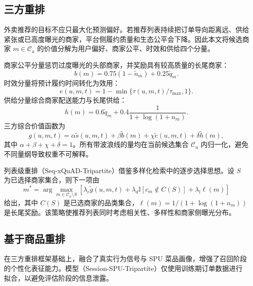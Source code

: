 \documentclass[12pt,a4paper]{article}
\begin{document}
    \subsection{三方重排}

    外卖推荐的目标不应只最大化预测偏好。若推荐列表持续把订单导向距离远、供给紧张或已高度曝光的商家，平台侧履约质量和生态公平会下降。因此本文将候选商家 $m\in\mathcal{C}_u$ 的价值分解为用户偏好、商家公平、时效和供给四个分量。

    商家公平分量惩罚过度曝光的头部商家，并奖励具有较高质量的长尾商家：
    \begin{equation}
        b(m)=0.75\left(1-\widetilde{n}_m\right)+0.25\widetilde{q}_m.
    \end{equation}
    时效分量将预计履约时间转化为效用：
    \begin{equation}
        e(u,m,t)=1-\min\{\tau(u,m,t)/\tau_{\max},1\}.
    \end{equation}
    供给分量综合商家配送能力与长尾供给：
    \begin{equation}
        h(m)=0.6\widetilde{q}_m+0.4\frac{1}{1+\log(1+n_m)}.
    \end{equation}
    三方综合价值函数为
    \begin{equation}
        g(u,m,t)=\alpha\widetilde{s}(u,m,t)+\beta\widetilde{b}(m)+\chi\widetilde{e}(u,m,t)+\delta\widetilde{h}(m),
    \end{equation}
    其中 $\alpha+\beta+\chi+\delta=1$。所有带波浪线的量均在当前候选集合 $\mathcal{C}_u$ 内归一化，避免不同量纲导致权重不可解释。

    列表级重排（Seq-xQuAD-Tripartite）借鉴多样化检索中的逐步选择思想\cite{santos2010xquad}。设 $S$ 为已选择商家集合，则下一项由
    \begin{equation}
        m^*=\arg\max_{m\in\mathcal{C}_u\setminus S}\left[\lambda_r\widetilde{g}(u,m,t)+\lambda_d\mathbb{I}[c_m\notin C(S)]+\lambda_l\ell(m)\right]
    \end{equation}
    给出，其中 $C(S)$ 是已选商家的品类集合，$\ell(m)=1/(1+\log(1+n_m))$ 是长尾奖励。该策略使推荐列表同时考虑相关性、多样性和商家侧曝光分布。
    
    \subsection{基于商品重排}
    
    在三方重排框架基础上，融合了真实行为信号与 SPU 菜品画像，增强了召回阶段的个性化表征能力。模型（Session-SPU-Tripartite）仅使用训练期订单数据进行拟合，以避免评估阶段的信息泄露。
    
\end{document}
